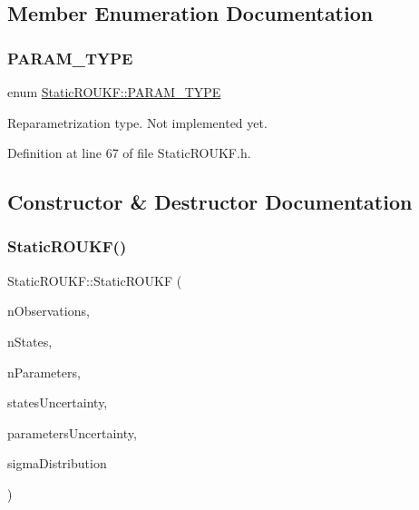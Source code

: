 \subsection{Member Enumeration Documentation}
\mbox{\label{classStaticROUKF_aa134c047aa5fcdeca7d527666c2903af}} 
\subsubsection{\texorpdfstring{P\+A\+R\+A\+M\+\_\+\+T\+Y\+PE}{PARAM\_TYPE}}
{\footnotesize\ttfamily enum \mbox{\hyperlink{classStaticROUKF_aa134c047aa5fcdeca7d527666c2903af}{Static\+R\+O\+U\+K\+F\+::\+P\+A\+R\+A\+M\+\_\+\+T\+Y\+PE}}}

Reparametrization type. Not implemented yet. 

Definition at line 67 of file Static\+R\+O\+U\+K\+F.\+h.



\subsection{Constructor \& Destructor Documentation}
\mbox{\label{classStaticROUKF_ad16035ac639499eb59aee6b88ca9ca52}} 
\subsubsection{\texorpdfstring{Static\+R\+O\+U\+K\+F()}{StaticROUKF()}}
{\footnotesize\ttfamily Static\+R\+O\+U\+K\+F\+::\+Static\+R\+O\+U\+KF (\begin{DoxyParamCaption}\item[{int}]{n\+Observations,  }\item[{int}]{n\+States,  }\item[{int}]{n\+Parameters,  }\item[{double $\ast$}]{states\+Uncertainty,  }\item[{double $\ast$}]{parameters\+Uncertainty,  }\item[{\mbox{\hyperlink{classSigmaPointsGenerator_ad6f9474c0313425a10add120e0acf944}{Sigma\+Points\+Generator\+::\+S\+I\+G\+M\+A\+\_\+\+D\+I\+S\+T\+R\+I\+B\+U\+T\+I\+ON}}}]{sigma\+Distribution }\end{DoxyParamCaption})}

